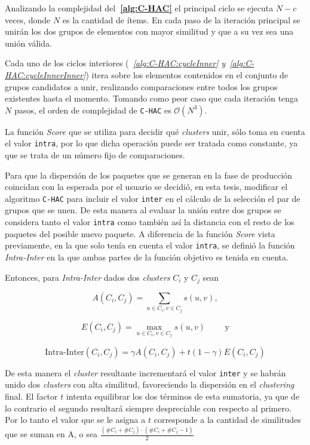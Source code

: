 Analizando la complejidad del\textbf{~\autoref{alg:C-HAC}} el principal ciclo se ejecuta $N - c$ veces, donde $N$ es la cantidad de ítems. En cada paso de la iteración principal se unirán los dos grupos de elementos con mayor similitud y que a su vez sea una unión válida. 

Cada uno de los ciclos interiores (\textit{~\autoref{alg:C-HAC:cycleInner} y~\autoref{alg:C-HAC:cycleInnerInner}}) itera sobre los elementos contenidos en el conjunto de grupos candidatos a unir, realizando comparaciones entre todos los grupos existentes hasta el momento. Tomando como peor caso que cada iteración tenga $N$ pasos, el orden de complejidad de \texttt{C-HAC} es $\mathcal{O}(N^{3})$. 

La función \textit{Score} que se utiliza para decidir qué {\em clusters} unir, sólo toma en cuenta el valor \texttt{intra}, por lo que dicha operación puede ser tratada como constante, ya que se trata de un número fijo de comparaciones.

Para que la dispersión de los paquetes que se generan en la fase de producción coincidan con la esperada por el usuario se decidió, en esta tesis, modificar el algoritmo \texttt{C-HAC} para incluir el valor \texttt{inter} en el cálculo de la selección el par de grupos que se unen. De esta manera al evaluar la unión entre dos grupos se considera tanto el valor \texttt{intra} como también así la distancia con el resto de los paquetes del posible nuevo paquete. A diferencia de la función \textit{Score} vista previamente, en la que solo tenía en cuenta el valor \texttt{intra}, se definió la función \textit{Intra-Inter} en la que ambas partes de la función objetivo es tenida en cuenta. 

Entonces, para \textit{Intra-Inter} dados dos {\em clusters} $C_i$ y $C_j$ sean

$$A(C_i,C_j) = \sum_{u \in C_i, v \in C_j}{s(u,v)},$$

$$E(C_i,C_j)=\max_{u \in C_i, v \in C_j}{s(u,v)} \qquad \mbox{ y}$$

$$\mbox{Intra-Inter}(C_i,C_j) = \gamma A(C_i,C_j) + t (1-\gamma) E(C_i,C_j)$$

De esta manera el {\em cluster} resultante incrementará el valor \texttt{inter} y se habrán unido dos {\em clusters} con alta similitud, favoreciendo la dispersión en el {\em clustering} final. El factor $t$ intenta equilibrar los dos términos de esta sumatoria, ya que de lo contrario el segundo resultará siempre despreciable con respecto al primero. Por lo tanto el valor que se le asigna a $t$ corresponde a la cantidad de similitudes que se suman en A, o sea $\frac{(\#C_i + \#C_j) \cdot (\#C_i + \#C_j - 1)}{2}$  

